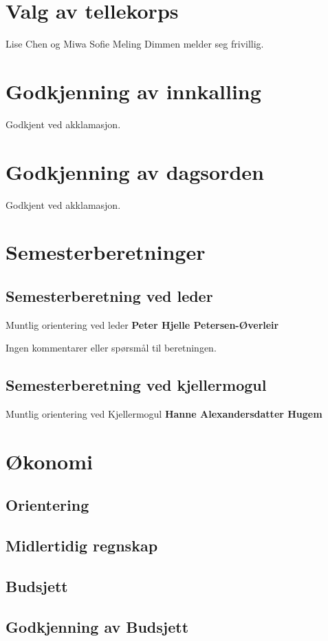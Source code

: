 \documentclass[10pt,norsk,a4paper,usenames,dvipsnames]{article}
\begin{document}
\section{Valg av tellekorps}
Lise Chen og Miwa Sofie Meling Dimmen melder seg frivillig.

\section{Godkjenning av innkalling}
Godkjent ved akklamasjon.

\section{Godkjenning av dagsorden}
Godkjent ved akklamasjon.


\section{Semesterberetninger}
    \subsection{Semesterberetning ved leder}

    Muntlig orientering ved leder
    \textbf{Peter Hjelle Petersen-Øverleir}

Ingen kommentarer eller spørsmål til beretningen. 
    
    \subsection{Semesterberetning ved kjellermogul}
    Muntlig orientering ved Kjellermogul
    \textbf{Hanne Alexandersdatter Hugem}
    
\section{Økonomi}

    \subsection{Orientering}
    \subsection{Midlertidig regnskap}
    \subsection{Budsjett}
    \subsection{Godkjenning av Budsjett}
\end{document}
